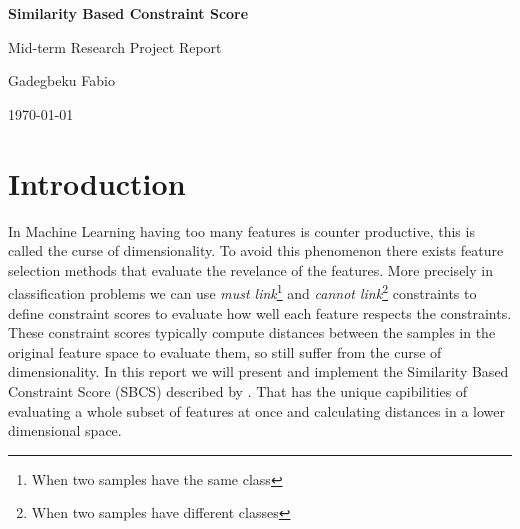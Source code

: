 \documentclass[a4paper,12pt]{article}
\begin{document}
\begin{titlepage}
    \centering
    {\huge\bfseries Similarity Based Constraint Score\par}
    \vspace{1cm}
    {\Large Mid-term Research Project Report\par}
    \vspace{1cm}
    {\large Gadegbeku Fabio\par}
    \vspace{1cm}
    \today\par
    \vspace{1cm}
    \hspace{0.2cm}
    \hspace{0.2cm}
    \par
\end{titlepage}
\tableofcontents
\newpage
\section{Introduction}
In Machine Learning having too many features is counter productive, this is called the curse of dimensionality.
To avoid this phenomenon there exists feature selection methods that evaluate the revelance of the features. More precisely
in classification problems we can use \textit{must link}\footnote{When two samples have the same class} and
\textit{cannot link}\footnote{When two samples have different classes}
constraints to define constraint scores to evaluate how well each feature
respects the constraints. These constraint scores typically compute distances between the samples in the original
feature space to evaluate them, so still suffer from the curse of dimensionality.
In this report we will present and implement the Similarity Based Constraint Score (SBCS) described by \cite{salmiSimilaritybasedConstraintScore2020}.
That has the unique capibilities of evaluating a whole subset of features at once and calculating distances
in a lower dimensional space.
\end{document}
